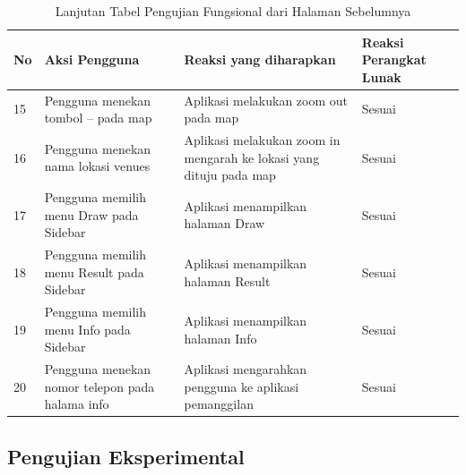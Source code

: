 \begin{table}[H]
\caption{Lanjutan Tabel Pengujian Fungsional dari Halaman Sebelumnya}
\label{table:tabelPengujianFungsional}
\begin{tabular}{|p{0.3cm}|p{5.7cm}|p{5.7cm}|p{3cm}|}
\hline
No & Aksi Pengguna                                                                      & Reaksi yang diharapkan                                                               & Reaksi Perangkat Lunak \\ \hline
15 & Pengguna menekan tombol – pada map                                                 & Aplikasi melakukan zoom out pada map                                                 & Sesuai                 \\ \hline
16 & Pengguna menekan nama lokasi venues                                                & Aplikasi melakukan zoom in mengarah ke lokasi yang dituju pada map                   & Sesuai                 \\ \hline
17 & Pengguna memilih menu Draw pada Sidebar                                            & Aplikasi menampilkan halaman Draw                                                    & Sesuai                 \\ \hline
18 & Pengguna memilih menu Result pada Sidebar                                          & Aplikasi menampilkan halaman Result                                                  & Sesuai                 \\ \hline
19 & Pengguna memilih menu Info pada Sidebar                                            & Aplikasi menampilkan halaman Info                                                    & Sesuai                 \\ \hline
20 & Pengguna menekan nomor telepon pada halama info                                    & Aplikasi mengarahkan pengguna ke aplikasi pemanggilan                                & Sesuai                 \\ \hline
\end{tabular}
\end{table}
\subsection{Pengujian Eksperimental}
\label{subsec:pengujianEksperimental}

